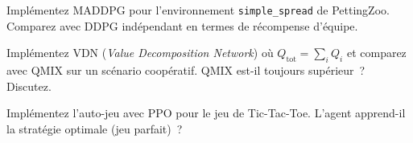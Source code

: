 \begin{exercice}[MADDPG]
Impl\'ementez MADDPG pour l'environnement \texttt{simple\_spread} de PettingZoo.
Comparez avec DDPG ind\'ependant en termes de r\'ecompense d'\'equipe.
\end{exercice}

\begin{exercice}
Impl\'ementez VDN (\emph{Value Decomposition Network}) o\`u $Q_{\text{tot}} = \sum_i Q_i$
et comparez avec QMIX sur un sc\'enario coop\'eratif. QMIX est-il toujours
sup\'erieur~? Discutez.
\end{exercice}

\begin{exercice}
Impl\'ementez l'auto-jeu avec PPO pour le jeu de Tic-Tac-Toe. L'agent
apprend-il la strat\'egie optimale (jeu parfait)~?
\end{exercice}
